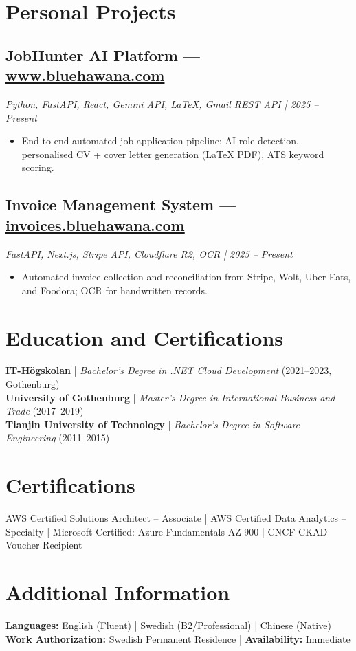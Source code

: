 \documentclass[a4paper,10pt]{article}
\begin{document}
\section*{Personal Projects}

\subsection*{JobHunter AI Platform --- \href{https://www.bluehawana.com}{www.bluehawana.com}}
\textit{Python, FastAPI, React, Gemini API, LaTeX, Gmail REST API | 2025 -- Present}
\begin{itemize}[noitemsep]
  \item End-to-end automated job application pipeline: AI role detection, personalised CV + cover letter generation (LaTeX PDF), ATS keyword scoring.
\end{itemize}

\subsection*{Invoice Management System --- \href{https://invoices.bluehawana.com}{invoices.bluehawana.com}}
\textit{FastAPI, Next.js, Stripe API, Cloudflare R2, OCR | 2025 -- Present}
\begin{itemize}[noitemsep]
  \item Automated invoice collection and reconciliation from Stripe, Wolt, Uber Eats, and Foodora; OCR for handwritten records.
\end{itemize}

\section*{Education and Certifications}

\textbf{IT-Högskolan} | \textit{Bachelor's Degree in .NET Cloud Development} (2021--2023, Gothenburg)\\[4pt]
\textbf{University of Gothenburg} | \textit{Master's Degree in International Business and Trade} (2017--2019)\\[4pt]
\textbf{Tianjin University of Technology} | \textit{Bachelor's Degree in Software Engineering} (2011--2015)

\section*{Certifications}
AWS Certified Solutions Architect -- Associate | AWS Certified Data Analytics -- Specialty | Microsoft Certified: Azure Fundamentals AZ-900 | CNCF CKAD Voucher Recipient

\section*{Additional Information}
\textbf{Languages:} English (Fluent) | Swedish (B2/Professional) | Chinese (Native)\\
\textbf{Work Authorization:} Swedish Permanent Residence | \textbf{Availability:} Immediate
\end{document}
